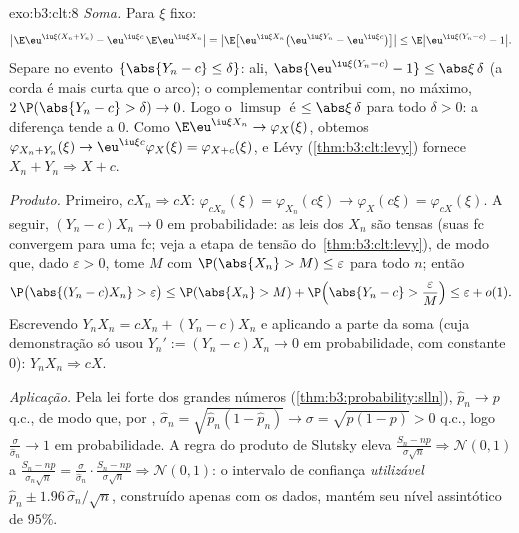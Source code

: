 \begin{solution}{exo:b3:clt:8}
\emph{Soma.} Para $\xi$ fixo:
\[
\bigl|\E\eu^{\iu\xi(X_n+Y_n)} -
\eu^{\iu\xi c}\,\E\eu^{\iu\xi X_n}\bigr|
= \bigl|\E\bigl[\eu^{\iu\xi X_n}\bigl(\eu^{\iu\xi Y_n} -
\eu^{\iu\xi c}\bigr)\bigr]\bigr|
\leq \E\bigl|\eu^{\iu\xi(Y_n - c)} - 1\bigr| .
\]
Separe no evento $\{\abs{Y_n - c} \leq \delta\}$: ali,
$\abs{\eu^{\iu\xi(Y_n-c)} - 1} \leq \abs\xi\,\delta$ (a
corda é mais curta que o arco); o complementar contribui
com, no máximo, $2\,\P(\abs{Y_n - c} > \delta) \to 0$. Logo o
$\limsup$ é $\leq \abs\xi\,\delta$ para todo $\delta > 0$:
a diferença tende a $0$. Como $\E\eu^{\iu\xi X_n} \to
\varphi_X(\xi)$, obtemos $\varphi_{X_n+Y_n}(\xi) \to
\eu^{\iu\xi c}\varphi_X(\xi) = \varphi_{X+c}(\xi)$, e
Lévy (\cref{thm:b3:clt:levy}) fornece $X_n + Y_n
\Rightarrow X + c$.

\emph{Produto.} Primeiro, $cX_n \Rightarrow cX$:
$\varphi_{cX_n}(\xi) = \varphi_{X_n}(c\xi) \to
\varphi_X(c\xi) = \varphi_{cX}(\xi)$. A seguir, $(Y_n - c)X_n
\to 0$ em probabilidade: as leis dos $X_n$ são tensas (suas
fc convergem para uma fc; veja a etapa de tensão do~\cref{thm:b3:clt:levy}), de modo que, dado $\varepsilon > 0$, tome $M$
com $\P(\abs{X_n} > M) \leq \varepsilon$ para todo $n$; então
\[
\P\bigl(\abs{(Y_n - c)X_n} > \varepsilon\bigr) \leq
\P(\abs{X_n} > M) + \P\Bigl(\abs{Y_n - c} >
\frac{\varepsilon}{M}\Bigr) \leq \varepsilon + o(1) .
\]
Escrevendo $Y_nX_n = cX_n + (Y_n - c)X_n$ e aplicando a parte
da soma (cuja demonstração só usou $Y_n' := (Y_n - c)X_n \to 0$ em
probabilidade, com constante $0$): $Y_nX_n \Rightarrow cX$.

\emph{Aplicação.} Pela lei forte dos grandes números
(\cref{thm:b3:probability:slln}), $\hat p_n \to p$ q.c., de modo que,
por , $\hat\sigma_n = \sqrt{\hat p_n(1 - \hat p_n)}
\to \sigma = \sqrt{p(1 - p)} > 0$ q.c., logo
$\frac{\sigma}{\hat\sigma_n} \to 1$ em probabilidade. A regra do produto
de Slutsky eleva $\frac{S_n - np}{\sigma\sqrt n}
\Rightarrow \mathcal N(0,1)$ a $\frac{S_n -
np}{\hat\sigma_n\sqrt n} = \frac{\sigma}{\hat\sigma_n}\cdot
\frac{S_n - np}{\sigma\sqrt n} \Rightarrow \mathcal N(0,1)$:
o intervalo de confiança \emph{utilizável} $\hat p_n \pm
1.96\,\hat\sigma_n/\sqrt n$, construído apenas com os dados,
mantém seu nível assintótico de $95\%$.
\end{solution}

